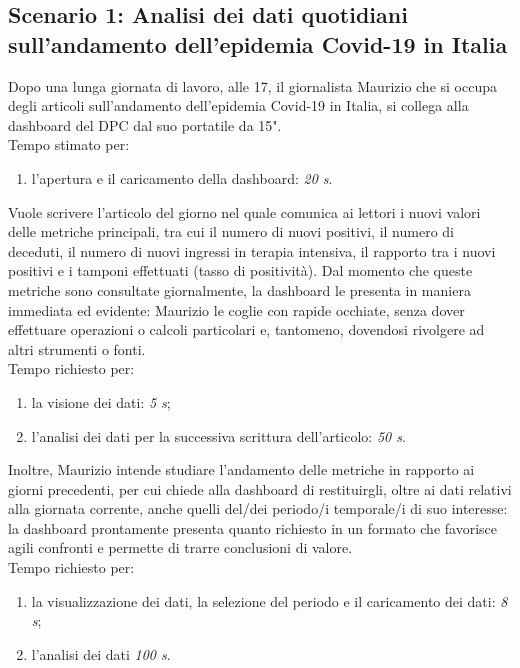 \subsection{Scenario 1: Analisi dei dati quotidiani sull'andamento dell'epidemia Covid-19 in Italia}
\label{ss:scenario-1}
Dopo una lunga giornata di lavoro, alle 17, il giornalista Maurizio che si occupa degli articoli sull'andamento dell'epidemia Covid-19 in Italia, si collega alla dashboard del DPC dal suo portatile da 15".\\
Tempo stimato per:
\begin{enumerate}
    \item l'apertura e il caricamento della dashboard: \textit{20 s}.
\end{enumerate}

\noindent
Vuole scrivere l'articolo del giorno nel quale comunica ai lettori i nuovi valori delle metriche principali, tra cui il numero di nuovi positivi, il numero di deceduti, il numero di nuovi ingressi in terapia intensiva, il rapporto tra i nuovi positivi e i tamponi effettuati (tasso di positività). Dal momento che queste metriche sono consultate giornalmente, la dashboard le presenta in maniera immediata ed evidente: Maurizio le coglie con rapide occhiate, senza dover effettuare operazioni o calcoli particolari e, tantomeno, dovendosi rivolgere ad altri strumenti o fonti.\\
Tempo richiesto per:
\begin{enumerate}
    \item la visione dei dati: \textit{5 s};
    \item l'analisi dei dati per la successiva scrittura dell'articolo: \textit{50 s}.
\end{enumerate}

\noindent
Inoltre, Maurizio intende studiare l'andamento delle metriche in rapporto ai giorni precedenti, per cui chiede alla dashboard di restituirgli, oltre ai dati relativi alla giornata corrente, anche quelli del/dei periodo/i temporale/i di suo interesse: la dashboard prontamente presenta quanto richiesto in un formato che favorisce agili confronti e permette di trarre conclusioni di valore.\\
Tempo richiesto per:
\begin{enumerate}
    \item la visualizzazione dei dati, la selezione del periodo e il caricamento dei dati: \textit{8 s};
    \item l'analisi dei dati \textit{100 s}.
\end{enumerate}

